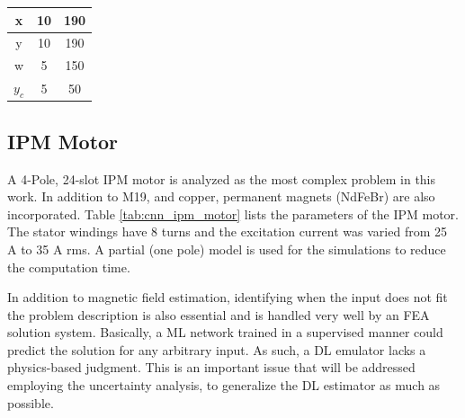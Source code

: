 \begin{minipage}{\textwidth}
\begin{minipage}[b]{0.4\textwidth}
\begin{tabular}{|c|c|c|}
        \hline \hline
        x     & 10 & 190 \\ \hline
        y     & 10 & 190 \\ \hline
        w     & 5  & 150 \\ \hline
        $y_c$ & 5  & 50  \\ \hline
        \end{tabular}
        \label{tab:cnn_transformer_parameters}
    \end{minipage}
\end{minipage}

\subsection{IPM Motor}
A 4-Pole, 24-slot IPM motor is analyzed as the most complex problem in this work. In addition to M19, and copper, permanent magnets (NdFeBr) are also incorporated. Table \ref{tab:cnn_ipm_motor} lists the parameters of the IPM motor. The stator windings have 8 turns and the excitation current was varied from 25 A to 35 A rms. A partial (one pole) model is used for the simulations to reduce the computation time.

In addition to magnetic field estimation, identifying when the input does not fit the problem description is also essential and is handled very well by an FEA solution system. Basically, a ML network trained in a supervised manner could predict the solution for any arbitrary input. As such, a DL emulator lacks a physics-based judgment. This is an important issue that will be addressed employing the uncertainty analysis, to generalize the DL estimator as much as possible.

